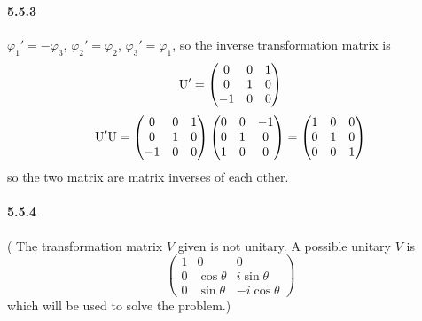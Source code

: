 \documentclass[a4paper]{article}
\begin{document}
\paragraph{5.5.3}
$\varphi_1'=-\varphi_3$, $\varphi_2'=\varphi_2$, $\varphi_3'=\varphi_1$, so the inverse transformation matrix is 
\[
\mathrm{U'}=\begin{pmatrix}
0&0&1\\
0&1&0\\
-1&0&0\\
\end{pmatrix}
\]
\[
\mathrm{U'}\mathrm{U}=\begin{pmatrix}
0&0&1\\
0&1&0\\
-1&0&0\\
\end{pmatrix}
\begin{pmatrix}
0&0&-1\\
0&1&0\\
1&0&0\\
\end{pmatrix}
=\begin{pmatrix}
1&0&0\\
0&1&0\\
0&0&1\\
\end{pmatrix}
\]
so the two matrix are matrix inverses of each other.

\paragraph{5.5.4}
(
The transformation matrix $V$ given is not unitary. A possible unitary $V$ is
\[
\begin{pmatrix}
1&0&0\\
0&\cos\theta&i\sin\theta\\
0&\sin\theta&-i\cos\theta
\end{pmatrix}
\]
which will be used to solve the problem.)
\end{document}
